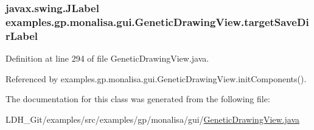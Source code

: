 \hypertarget{classexamples_1_1gp_1_1monalisa_1_1gui_1_1_genetic_drawing_view_a44edf9b69a5bf1587dc553b9a3ac83a3}{
\subsubsection[{target\-Save\-Dir\-Label}]{\setlength{\rightskip}{0pt plus 5cm}javax.\-swing.\-J\-Label examples.\-gp.\-monalisa.\-gui.\-Genetic\-Drawing\-View.\-target\-Save\-Dir\-Label\hspace{0.3cm}{\ttfamily [private]}}}\label{classexamples_1_1gp_1_1monalisa_1_1gui_1_1_genetic_drawing_view_a44edf9b69a5bf1587dc553b9a3ac83a3}


Definition at line 294 of file Genetic\-Drawing\-View.\-java.



Referenced by examples.\-gp.\-monalisa.\-gui.\-Genetic\-Drawing\-View.\-init\-Components().



The documentation for this class was generated from the following file\-:\begin{DoxyCompactItemize}
\item 
L\-D\-H\-\_\-\-Git/examples/src/examples/gp/monalisa/gui/\hyperlink{gp_2monalisa_2gui_2_genetic_drawing_view_8java}{Genetic\-Drawing\-View.\-java}\end{DoxyCompactItemize}
